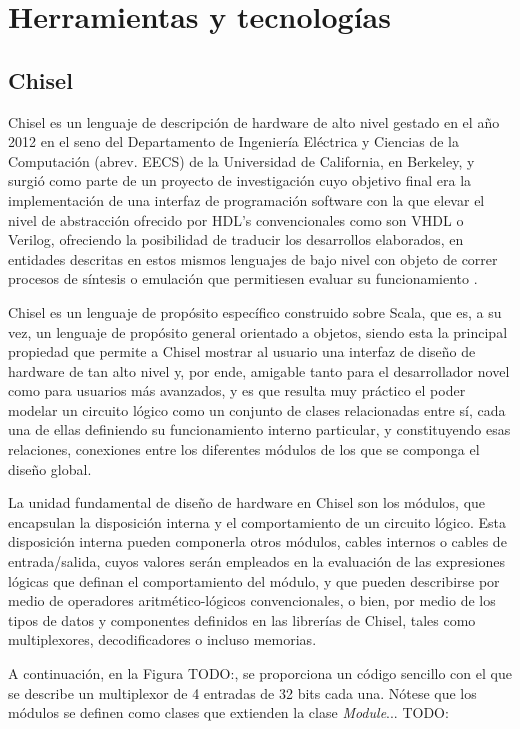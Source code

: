 \chapter{Herramientas y tecnologías}

\section{Chisel}

Chisel es un lenguaje de descripción de hardware de alto nivel gestado en el año 2012 en el seno del Departamento de Ingeniería Eléctrica y Ciencias de la Computación (abrev. EECS) de la Universidad de California, en Berkeley, y surgió como parte de un proyecto de investigación cuyo objetivo final era la implementación de una interfaz de programación software con la que elevar el nivel de abstracción ofrecido por HDL's convencionales como son VHDL o Verilog, ofreciendo la posibilidad de traducir los desarrollos elaborados, en entidades descritas en estos mismos lenguajes de bajo nivel con objeto de correr procesos de síntesis o emulación que permitiesen evaluar su funcionamiento \cite{chiselEECS}.

Chisel es un lenguaje de propósito específico construido sobre Scala, que es, a su vez, un lenguaje de propósito general orientado a objetos, siendo esta la principal propiedad que permite a Chisel mostrar al usuario una interfaz de diseño de hardware de tan alto nivel y, por ende, amigable tanto para el desarrollador novel como para usuarios más avanzados, y es que resulta muy práctico el poder modelar un circuito lógico como un conjunto de clases relacionadas entre sí, cada una de ellas definiendo su funcionamiento interno particular, y constituyendo esas relaciones, conexiones entre los diferentes módulos de los que se componga el diseño global.

La unidad fundamental de diseño de hardware en Chisel son los módulos, que encapsulan la disposición interna y el comportamiento de un circuito lógico. Esta disposición interna pueden componerla otros módulos, cables internos o cables de entrada/salida, cuyos valores serán empleados en la evaluación de las expresiones lógicas que definan el comportamiento del módulo, y que pueden describirse por medio de operadores aritmético-lógicos convencionales, o bien, por medio de los tipos de datos y componentes definidos en las librerías de Chisel, tales como multiplexores, decodificadores o incluso memorias.

A continuación, en la Figura TODO:, se proporciona un código sencillo con el que se describe un multiplexor de 4 entradas de 32 bits cada una. Nótese que los módulos se definen como clases que extienden la clase \textit{Module}... TODO:

